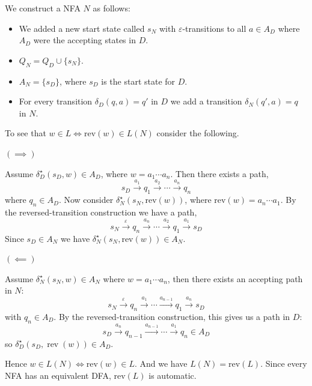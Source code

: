 \documentclass[12pt]{article}
\begin{document}
\begin{solution}
    \bbni 

    We construct a NFA $N$ as follows: 
    \begin{itemize}
        \item We added a new start state called $s_N$ with $\varepsilon$-transitions to all $a \in A_D$ where $A_D$ were the accepting states in $D$. 

        \item $Q_N = Q_D \cup \{s_N\}$.        

        \item $A_N = \{s_D\}$, where $s_D$ is the start state for $D$.  
            
        \item For every transition $\delta_D(q, a) = q'$ in $D$ we add a transition $\delta_N (q', a) = q$ in $N$. 
    \end{itemize}

    To see that $w \in L \iff \text{rev}(w) \in L(N)$ consider the following. 

    $(\implies)$

    Assume $\delta_D^\star(s_D, w) \in A_D$, where $w = a_1 \cdots a_n$. Then there exists a path, 
    \[s_D \overset{a_1}{\rightarrow} q_1 \overset{a_2}{\rightarrow} \cdots \overset{a_{n}}{\rightarrow} q_n \]
    where $q_n \in A_D$. 
    Now consider $\delta_N^\star(s_N, \text{rev}(w))$, where $\text{rev}(w) = a_n\cdots a_1$. By the reversed-transition construction we have a path,
    \[s_N \overset{\varepsilon}{\rightarrow} q_n \overset{a_n}{\rightarrow} \cdots \overset{a_2}{\rightarrow} q_1 \overset{a_1}{\rightarrow} s_D \]
    Since $s_D \in A_N$ we have $\delta_N^\star(s_N, \text{rev}(w)) \in A_N$. 
    
    $(\impliedby)$
    
    Assume $\delta^\star_N(s_N, w) \in A_N$ where $w = a_1\cdots a_n$, then there exists an accepting path in $N$:
    \[s_N \xrightarrow{\varepsilon} q_n  \xrightarrow{a_1} \cdots \xrightarrow{a_{n-1}}  q_1 \xrightarrow{a_n} s_D\] 
    with $q_n \in A_D$. By the reversed-transition construction, this gives us a path in $D$:
    \[s_D \xrightarrow{a_n} q_{n-1} \xrightarrow{a_{n-1}} \cdots \xrightarrow{a_1} q_n \in A_D\]
    so $\delta^\star_D(s_D, \operatorname{rev}(w)) \in A_D$.

    Hence $w \in L(N) \iff \text{rev}(w) \in L$. And we have $L(N) = \text{rev}(L)$.  Since every NFA has an equivalent DFA, $\text{rev}(L)$ is automatic. 
\end{solution}
\end{document}
